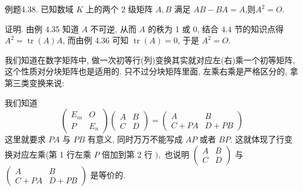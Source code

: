 \documentclass{article}
\begin{document}
\vspace{1ex}
{\heiti 例题4.38.} {\kaishu 已知数域 $K$ 上的两个 2 级矩阵 $A, B$ 满足 $A B - B A = A$,则$A^2 = O$.}

\vspace{1ex}
{\heiti 证明.} 由例 4.35 知道 $A$ 不可逆, 从而 $A$ 的秩为 1 或 0, 结合 $4.4$ 节的知识点得 $A^{2}=\operatorname{tr}(A) A$, 而由例 4.36 可知 $\operatorname{tr}(A)=0$, 于是 $A^{2}=O .$

\vspace{2ex}

\vspace{2ex}
我们知道在数字矩阵中, 做一次初等行(列)变换其实就对应左(右)乘一个初等矩阵, 这个性质对分块矩阵也是适用的. 只不过分块矩阵里面, 左乘右乘是严格区分的, 拿第三类变换来说:

我们知道
\begin{equation*}
    \left(\begin{array}{cc}
        E_{m} & O     \\
        P     & E_{n}
    \end{array}\right)\left(\begin{array}{cc}
        A & B \\
        C & D
    \end{array}\right)=\left(\begin{array}{cc}
        A     & B     \\
        C+P A & D+P B
    \end{array}\right)
\end{equation*}
这里就要求 $P A$ 与 $P B$ 有意义, 同时万万不能写成 $A P$ 或者 $B P .$ 这就体现了行变换对应左乘(第 1 行左乘 $P$ 倍加到第 2 行 $),$ 也说明 $\left(\begin{array}{cc}A & B \\ C & D\end{array}\right)$ 与 $\left(\begin{array}{cc}A & B \\ C+P A & D+P B\end{array}\right)$ 是等价的.
\end{document}
